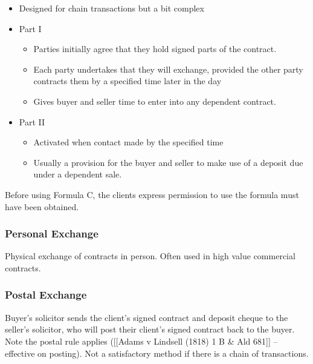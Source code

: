 \documentclass[
]{article}
\newenvironment{Shaded}{}{}
\newcommand{\NormalTok}[1]{#1}
\providecommand{\tightlist}{%
  \setlength{\itemsep}{0pt}\setlength{\parskip}{0pt}}
\begin{document}
\begin{itemize}
\tightlist
\item
  Designed for chain transactions but a bit complex
\item
  Part I

  \begin{itemize}
  \tightlist
  \item
    Parties initially agree that they hold signed parts of the contract.
  \item
    Each party undertakes that they will exchange, provided the other
    party contracts them by a specified time later in the day
  \item
    Gives buyer and seller time to enter into any dependent contract.
  \end{itemize}
\item
  Part II

  \begin{itemize}
  \tightlist
  \item
    Activated when contact made by the specified time
  \item
    Usually a provision for the buyer and seller to make use of a
    deposit due under a dependent sale.
  \end{itemize}
\end{itemize}

\begin{Shaded}
\begin{Highlighting}[]
\NormalTok{Before using Formula C, the client\textquotesingle{}s express permission to use the formula must have been obtained. }
\end{Highlighting}
\end{Shaded}

\hypertarget{personal-exchange}{%
\subsubsection{Personal Exchange}\label{personal-exchange}}

Physical exchange of contracts in person. Often used in high value
commercial contracts.

\hypertarget{postal-exchange}{%
\subsubsection{Postal Exchange}\label{postal-exchange}}

Buyer's solicitor sends the client's signed contract and deposit cheque
to the seller's solicitor, who will post their client's signed contract
back to the buyer. Note the postal rule applies ({[}{[}Adams v Lindsell
(1818) 1 B \& Ald 681{]}{]} -- effective on posting). Not a satisfactory
method if there is a chain of transactions.
\end{document}

